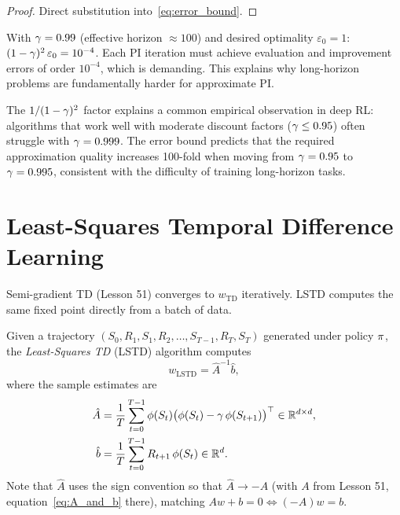 \documentclass[11pt,a4paper]{article}
\begin{document}
\begin{proof}
Direct substitution into~\eqref{eq:error_bound}.
\end{proof}

\begin{example}
\label{ex:accuracy}
With $\gamma = 0.99$ (effective horizon $\approx 100$) and desired
optimality $\varepsilon_0 = 1$:
$(1-\gamma)^2\,\varepsilon_0 = 10^{-4}$.
Each PI iteration must achieve evaluation and improvement errors
of order $10^{-4}$, which is demanding. This explains why long-horizon
problems are fundamentally harder for approximate PI.
\end{example}

\begin{rlconnection}[title={Error Propagation in Deep RL}]
The $1/(1-\gamma)^2$ factor explains a common empirical
observation in deep RL: algorithms that work well with moderate
discount factors ($\gamma \leq 0.95$) often struggle with
$\gamma = 0.999$. The error bound predicts that the required
approximation quality increases 100-fold when moving from
$\gamma = 0.95$ to $\gamma = 0.995$, consistent with the
difficulty of training long-horizon tasks.
\end{rlconnection}

\section{Least-Squares Temporal Difference Learning}
\label{sec:lstd}

Semi-gradient TD (Lesson 51) converges to $w_{\mathrm{TD}}$ iteratively.
LSTD computes the same fixed point directly from a batch of data.

\begin{definition}
\label{def:lstd}
Given a trajectory $(S_0, R_1, S_1, R_2, \ldots, S_{T-1}, R_T, S_T)$
generated under policy $\pi$, the \emph{Least-Squares TD} (LSTD)
algorithm computes
\begin{equation}
  w_{\mathrm{LSTD}} = \hat{A}^{-1}\hat{b},
  \label{eq:lstd}
\end{equation}
where the sample estimates are
\begin{align}
  \hat{A} &= \frac{1}{T}\sum_{t=0}^{T-1}
  \phi(S_t)\bigl(\phi(S_t)
  - \gamma\,\phi(S_{t+1})\bigr)^\top
  \in \mathbb{R}^{d \times d},
  \label{eq:A_hat}\\
  \hat{b} &= \frac{1}{T}\sum_{t=0}^{T-1}
  R_{t+1}\,\phi(S_t) \in \mathbb{R}^d.
  \label{eq:b_hat}
\end{align}
Note that $\hat{A}$ uses the sign convention so that
$\hat{A} \to -A$ (with $A$ from Lesson 51,
equation~\eqref{eq:A_and_b} there), matching
$Aw + b = 0 \Leftrightarrow (-A)w = b$.
\end{definition}
\end{document}
